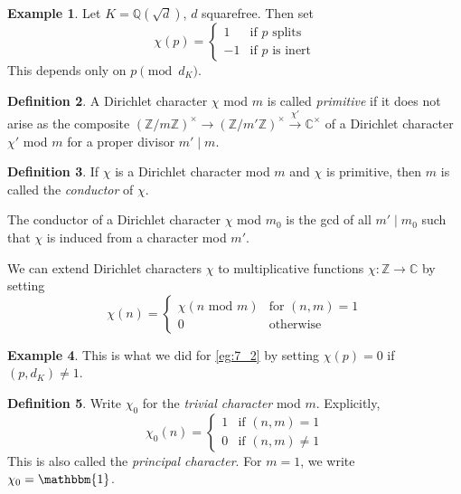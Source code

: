 \documentclass[11pt]{article}
\theoremstyle{definition}
\newtheorem{definition}{Definition}[section]
\newtheorem{example}[definition]{Example}
\theoremstyle{plain}
\theoremstyle{remark}
\newcommand{\ZZ}{\mathbb{Z}}
\newcommand{\QQ}{\mathbb{Q}}
\newcommand{\CC}{\mathbb{C}}
\begin{document}
\begin{example}\label{eg:7_2}
    Let $K = \QQ(\sqrt{d})$, $d$ squarefree. Then set
    \begin{equation*}
        \chi(p) = \begin{cases}
            1 & \text{if } p \text{ splits}\\
            -1 & \text{if } p \text{ is inert}
        \end{cases}
    \end{equation*}
    This depends only on $p \pmod{d_K}$.
\end{example}

\begin{definition}\label{def:7_3}
    A Dirichlet character $\chi$ mod $m$ is called \emph{primitive} if it does not arise as the composite $(\ZZ/m\ZZ)^\times \to (\ZZ/m'\ZZ)^\times \xrightarrow{\chi'} \CC^\times$ of a Dirichlet character $\chi'$ mod $m$ for a proper divisor $m' \mid m$.
\end{definition}

\begin{definition}\label{def:7_4}
    If $\chi$ is a Dirichlet character mod $m$ and $\chi$ is primitive, then $m$ is called the \emph{conductor} of $\chi$.
\end{definition}

The conductor of a Dirichlet character $\chi$ mod $m_0$ is the gcd of all $m' \mid m_0$ such that $\chi$ is induced from a character mod $m'$.

We can extend Dirichlet characters $\chi$ to multiplicative functions $\chi : \ZZ \to \CC$ by setting
\begin{equation*}
    \chi(n) =
    \begin{cases}
        \chi(n \textrm{ mod }{m}) & \text{for } (n, m) = 1\\
        0 & \text{otherwise}
    \end{cases}
\end{equation*}


\begin{example}\label{eg:7_6}
    This is what we did for \autoref{eg:7_2} by setting $\chi(p) = 0$ if $(p, d_K) \neq 1$.
\end{example}

\begin{definition}\label{def:7_7}
    Write $\chi_0$ for the \emph{trivial character} mod $m$. Explicitly,
    \begin{equation*}
        \chi_0(n) =
        \begin{cases}
            1 & \text{if } (n, m) = 1\\
            0 & \text{if } (n, m) \neq 1
        \end{cases}
    \end{equation*}
    This is also called the \emph{principal character}.
    For $m = 1$, we write $\chi_0 = \mathbbm{1}$.
\end{definition}
\end{document}
